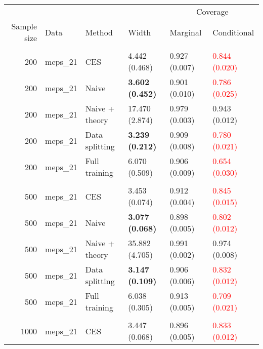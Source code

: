 
\begin{tabular}[t]{rlllll}
\toprule
\multicolumn{4}{c}{ } & \multicolumn{2}{c}{Coverage} \\
\cmidrule(l{3pt}r{3pt}){5-6}
Sample size & Data & Method & Width & Marginal & Conditional\\
\midrule
\addlinespace[0.3em]
\multicolumn{6}{l}{\textbf{200}}\\
\hspace{1em}200 & meps\_21 & CES & 4.442 (0.468) & 0.927 (0.007) & \textcolor{red}{0.844 (0.020)}\\
\hspace{1em}200 & meps\_21 & Naive & \textbf{3.602 (0.452)} & 0.901 (0.010) & \textcolor{red}{0.786 (0.025)}\\
\hspace{1em}200 & meps\_21 & Naive + theory & 17.470 (2.874) & 0.979 (0.003) & 0.943 (0.012)\\
\hspace{1em}200 & meps\_21 & Data splitting & \textbf{3.239 (0.212)} & 0.909 (0.008) & \textcolor{red}{0.780 (0.021)}\\
\hspace{1em}200 & meps\_21 & Full training & 6.070 (0.509) & 0.906 (0.009) & \textcolor{red}{0.654 (0.030)}\\
\addlinespace[0.3em]
\multicolumn{6}{l}{\textbf{500}}\\
\hspace{1em}500 & meps\_21 & CES & 3.453 (0.074) & 0.912 (0.004) & \textcolor{red}{0.845 (0.015)}\\
\hspace{1em}500 & meps\_21 & Naive & \textbf{3.077 (0.068)} & 0.898 (0.005) & \textcolor{red}{0.802 (0.012)}\\
\hspace{1em}500 & meps\_21 & Naive + theory & 35.882 (4.705) & 0.991 (0.002) & 0.974 (0.008)\\
\hspace{1em}500 & meps\_21 & Data splitting & \textbf{3.147 (0.109)} & 0.906 (0.006) & \textcolor{red}{0.832 (0.012)}\\
\hspace{1em}500 & meps\_21 & Full training & 6.038 (0.305) & 0.913 (0.005) & \textcolor{red}{0.709 (0.021)}\\
\addlinespace[0.3em]
\multicolumn{6}{l}{\textbf{1000}}\\
\hspace{1em}1000 & meps\_21 & CES & 3.447 (0.068) & 0.896 (0.005) & \textcolor{red}{0.833 (0.012)}\\

\end{tabular}
